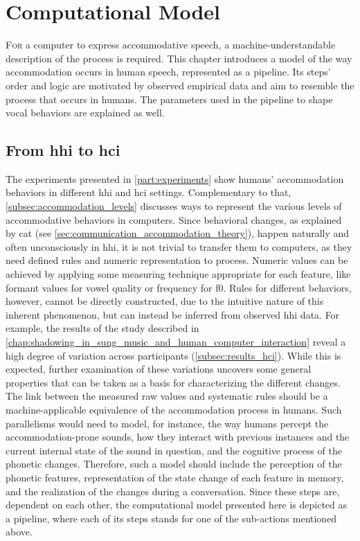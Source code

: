 \chapter[Computational Model]{Computational Model}
\label{chap:computational_model}

\lettrine{F}{or} a computer to express accommodative speech, a machine-understandable description of the process is required.
This chapter introduces a model of the way accommodation occurs in human speech, represented as a pipeline.
Its steps' order and logic are motivated by observed empirical data and aim to resemble the process that occurs in humans.
The parameters used in the pipeline to shape vocal behaviors are explained as well.

\pagebreak

\section{From \acs{hhi} to \acs{hci}}
\label{sec:from_hhi_to_hci}

The experiments presented in \cref{part:experiments} show humans' accommodation behaviors in different \ac{hhi} and \ac{hci} settings.
Complementary to that, \cref{subsec:accommodation_levels} discusses ways to represent the various levels of accommodative behaviors in computers.
Since behavioral changes, as explained by \ac{cat} (see \cref{sec:communication_accommodation_theory}), happen naturally and often unconsciously in \ac{hhi}, it is not trivial to transfer them to computers, as they need defined rules and numeric representation to process.
Numeric values can be achieved by applying some measuring technique appropriate for each feature, like formant values for vowel quality or frequency for \ac{f0}.
Rules for different behaviors, however, cannot be directly constructed, due to the intuitive nature of this inherent phenomenon, but can instead be inferred from observed \ac{hhi} data.
For example, the results of the study described in \cref{chap:shadowing_in_sung_music_and_human_computer_interaction} reveal a high degree of variation across participants (\cref{subsec:results_hci}).
While this is expected, further examination of these variations uncovers some general properties that can be taken as a basis for characterizing the different changes.
The link between the measured raw values and systematic rules should be a machine-applicable equivalence of the accommodation process in humans.
Such parallelisms would need to model, for instance, the way humans percept the accommodation-prone sounds, how they interact with previous instances and the current internal state of the sound in question, and the cognitive process of the phonetic changes.
Therefore, such a model should include the perception of the phonetic features, representation of the state change of each feature in memory, and the realization of the changes during a conversation.
Since these steps are, dependent on each other, the computational model presented here is depicted as a pipeline, where each of its steps stands for one of the sub-actions mentioned above.

